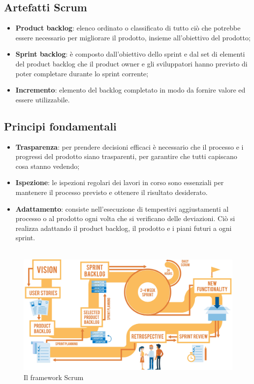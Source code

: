 \subsection{Artefatti Scrum}
\begin{itemize}
    \item \textbf{Product backlog}: elenco ordinato o classificato di tutto ciò che potrebbe
          essere necessario per migliorare il prodotto, insieme all'obiettivo del prodotto;
    \item \textbf{Sprint backlog}: è composto dall'obiettivo dello sprint e dal set di
          elementi del product backlog che il product owner e gli sviluppatori hanno previsto
          di poter completare durante lo sprint corrente;
    \item \textbf{Incremento}: elemento del backlog completato in modo da fornire valore
          ed essere utilizzabile.
\end{itemize}
\subsection{Principi fondamentali}
\begin{itemize}
    \item \textbf{Trasparenza}: per prendere decisioni efficaci è necessario
          che il processo e i progressi del prodotto siano trasparenti,
          per garantire che tutti capiscano cosa stanno vedendo;
    \item \textbf{Ispezione}: le ispezioni regolari dei lavori in corso sono
          essenziali per mantenere il processo previsto e ottenere il risultato desiderato.
    \item \textbf{Adattamento}: consiste nell'esecuzione di tempestivi aggiustamenti
          al processo o al prodotto ogni volta che si verificano delle deviazioni. Ciò si
          realizza adattando il product backlog, il prodotto e i piani futuri a ogni sprint.\\\\
\end{itemize}

\begin{figure}[h!]
    \centering
    \includegraphics[scale = 0.08]{template/images/scrum.jpg}
    \caption{Il framework Scrum}
    \label{fig:2.1} %
\end{figure}